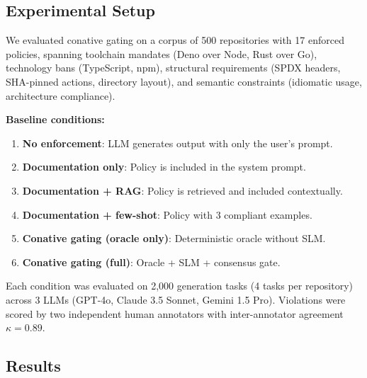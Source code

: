 \documentclass[11pt,a4paper]{article}
\begin{document}
\subsection{Experimental Setup}

We evaluated conative gating on a corpus of 500 repositories with
17 enforced policies, spanning toolchain mandates (Deno over Node,
Rust over Go), technology bans (TypeScript, npm), structural
requirements (SPDX headers, SHA-pinned actions, directory layout),
and semantic constraints (idiomatic usage, architecture compliance).

\textbf{Baseline conditions:}

\begin{enumerate}[label=(\alph*)]
  \item \textbf{No enforcement}: LLM generates output with only
        the user's prompt.
  \item \textbf{Documentation only}: Policy is included in the
        system prompt.
  \item \textbf{Documentation + RAG}: Policy is retrieved and
        included contextually.
  \item \textbf{Documentation + few-shot}: Policy with 3 compliant
        examples.
  \item \textbf{Conative gating (oracle only)}: Deterministic oracle
        without SLM.
  \item \textbf{Conative gating (full)}: Oracle + SLM + consensus gate.
\end{enumerate}

Each condition was evaluated on 2,000 generation tasks (4 tasks per
repository) across 3 LLMs (GPT-4o, Claude 3.5 Sonnet, Gemini 1.5 Pro).
Violations were scored by two independent human annotators with
inter-annotator agreement $\kappa = 0.89$.

\subsection{Results}
\end{document}
